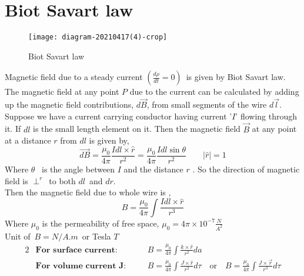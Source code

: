 \section{Biot Savart law}
 \begin{wrapfigure}{r}{0.25\textwidth}
	\begin{center}
		\texttt{[image: diagram-20210417(4)-crop]}
	\end{center}
	\caption{Biot Savart law}
\end{wrapfigure}
Magnetic field due to a steady current ${(\frac{d\rho}{dt}=0)}$\ is given by Biot Savart law.
The magnetic field at any point $P$ due to the current can be calculated by adding up the magnetic field contributions, $d \vec{{B}}$, from small segments of the wire $d \vec{l}$.
	\\Suppose we have a current carrying conductor having current '$I$' flowing through it. If $dl$ is the small length element on it. Then the magnetic field $\vec{B}$ at any point at a distance $r$ from $dl$ is given by,
	\begin{equation}\label{key}
	\vec{dB}={\frac{\mu_0}{4\pi}\frac{Idl\times{\hat{r}}}{r^2}}=\frac{\mu_0}{4\pi}\frac{Idl\sin\theta}{r^2}\qquad \vert{\hat{r}\vert}=1
	\end{equation}
	Where $\theta$ \ is the angle between $I$ and the distance $r$ . So the direction of magnetic field is $\perp^r$\ to both $dl$\ and $dr$. \\Then the magnetic field due to whole wire is ,
		\begin{equation}\label{key}
		B=\frac{\mu_0}{4\pi}\int\frac{Idl\times\hat{r}}{r^3}
		\end{equation}
 Where $\mu_0$ is the permeability of free space, $ \mu_0=4\pi\times10^{-7}\frac{N}{A^2}$\\
Unit of\ $B =N/A.m $\ or Tesla $T$
	\begin{alignat*}{2}
	&\textbf{For surface current:}\quad  &&B=\frac{\mu_0}{4\pi}\int\frac{k\times\hat{r}}{r^2}da\\ 
	&\textbf{For volume current J:}\quad  &&B=\frac{\mu_0}{4\pi}\int\frac{J\times\hat{r}}{r^2}d\tau \quad \text{or}\quad B=\frac{\mu_0}{4\pi}\int\frac{J\times\vec{r}}{r^3}d\tau\\
	\end{alignat*}
